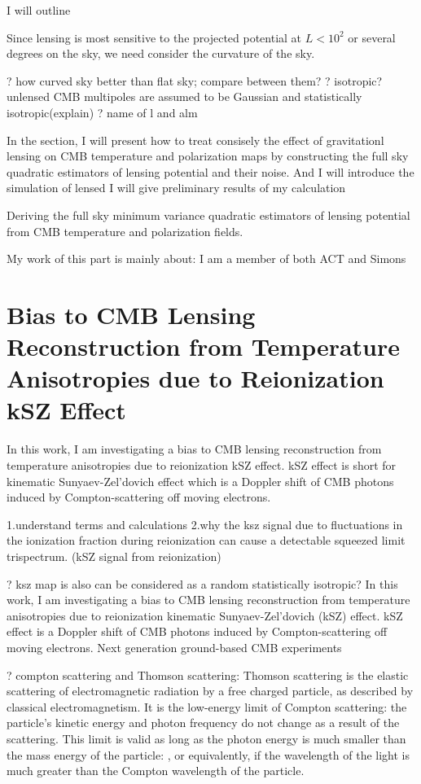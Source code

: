 \documentclass[12pt, notitlepage, onecolumn, amsmath, amssymb, aps]{revtex4-1}
\begin{document}
I will outline 

Since lensing is most sensitive to the projected potential at \(L<10^2\) or several degrees on the sky, we need consider the curvature of the sky. 


? how curved sky better than flat sky; compare between them? 
? isotropic? unlensed CMB multipoles are assumed to be Gaussian and statistically isotropic(explain)
? name of l and alm

In the section, I will present how to treat consisely the effect of gravitationl lensing on CMB temperature and polarization maps by constructing the full sky quadratic estimators of lensing potential and their noise. And I will introduce the simulation of lensed I will give preliminary results of my calculation 

Deriving the full sky minimum variance quadratic estimators of lensing potential from CMB temperature and polarization fields.

My work of this part is mainly about:
I am a member of both ACT and Simons

\section{Bias to CMB Lensing Reconstruction from Temperature Anisotropies due to Reionization kSZ Effect}
\label{sec:org093d799}

In this work, I am investigating a bias to CMB lensing reconstruction from temperature anisotropies due to reionization kSZ effect.
kSZ effect is short for kinematic Sunyaev-Zel'dovich effect which is a Doppler shift of CMB photons induced by Compton-scattering off moving electrons.



1.understand terms and calculations\cite{Ferraro:2017fac} \cite{Alvarez:2015xzu}
2.why the ksz signal due to fluctuations in the ionization fraction during reionization can cause a detectable squeezed limit trispectrum. (kSZ signal from reionization)\cite{Smith:2016lnt}

? ksz map is also can be considered as a random statistically isotropic?
In this work, I am investigating a bias to CMB lensing reconstruction from temperature anisotropies due to reionization kinematic Sunyaev-Zel'dovich (kSZ) effect. kSZ effect is a Doppler shift of CMB photons induced by Compton-scattering off moving electrons. Next generation ground-based CMB experiments 

? compton scattering and Thomson scattering: Thomson scattering is the elastic scattering of electromagnetic radiation by a free charged particle, as described by classical electromagnetism. It is the low-energy limit of Compton scattering: the particle's kinetic energy and photon frequency do not change as a result of the scattering. This limit is valid as long as the photon energy is much smaller than the mass energy of the particle: , or equivalently, if the wavelength of the light is much greater than the Compton wavelength of the particle.
\end{document}
